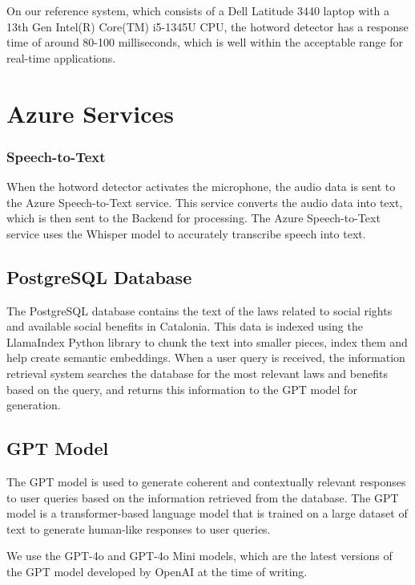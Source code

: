 \documentclass[a4paper,12pt,twoside]{ThesisStyle}
\begin{document}
On our reference system, which consists of a Dell Latitude 3440 laptop with a 13th Gen Intel(R) Core(TM) i5-1345U CPU, the hotword detector has a response time of around 80-100 milliseconds, which is well within the acceptable range for real-time applications.

\section{Azure Services}
\label{sec:azure_services}

\subsubsection{Speech-to-Text}

When the hotword detector activates the microphone, the audio data is sent to the Azure Speech-to-Text service. This service converts the audio data into text, which is then sent to the Backend for processing. The Azure Speech-to-Text service uses the Whisper \cite{Radford2022RobustSpeechRecognitionLargeScale} model to accurately transcribe speech into text.

\subsection{PostgreSQL Database}
\label{subsec:database}

The PostgreSQL database contains the text of the laws related to social rights and available social benefits in Catalonia. This data is indexed using the LlamaIndex Python library to chunk the text into smaller pieces, index them and  help create semantic embeddings. When a user query is received, the information retrieval system searches the database for the most relevant laws and benefits based on the query, and returns this information to the GPT model for generation.

\subsection{GPT Model}
\label{subsec:gpt_model}

The GPT model is used to generate coherent and contextually relevant responses to user queries based on the information retrieved from the database. The GPT model is a transformer-based \cite{Vaswani2023AttentionNeed} language model that is trained on a large dataset of text to generate human-like responses to user queries.

We use the GPT-4o and GPT-4o Mini models, which are the latest versions of the GPT model developed by OpenAI at the time of writing.
\end{document}

